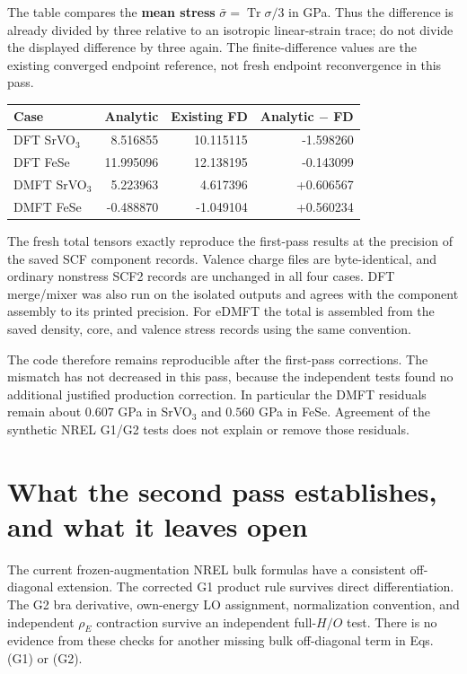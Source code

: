 \documentclass[11pt]{article}
\newcommand{\Tr}{\operatorname{Tr}}
\begin{document}
The table compares the \textbf{mean stress} $\bar\sigma=\Tr\sigma/3$ in GPa. Thus the difference is already divided by three relative to an isotropic linear-strain trace; do not divide the displayed difference by three again. The finite-difference values are the existing converged endpoint reference, not fresh endpoint reconvergence in this pass.
\begin{center}\begin{tabular}{lrrr}\toprule
Case & Analytic & Existing FD & Analytic $-$ FD\\\midrule
DFT SrVO$_3$ & 8.516855 & 10.115115 & -1.598260\\
DFT FeSe & 11.995096 & 12.138195 & -0.143099\\
DMFT SrVO$_3$ & 5.223963 & 4.617396 & +0.606567\\
DMFT FeSe & -0.488870 & -1.049104 & +0.560234\\
\bottomrule\end{tabular}\end{center}
The fresh total tensors exactly reproduce the first-pass results at the precision of the saved SCF component records. Valence charge files are byte-identical, and ordinary nonstress SCF2 records are unchanged in all four cases. DFT merge/mixer was also run on the isolated outputs and agrees with the component assembly to its printed precision. For eDMFT the total is assembled from the saved density, core, and valence stress records using the same convention.

The code therefore remains reproducible after the first-pass corrections. The mismatch has not decreased in this pass, because the independent tests found no additional justified production correction. In particular the DMFT residuals remain about $0.607$ GPa in SrVO$_3$ and $0.560$ GPa in FeSe. Agreement of the synthetic NREL G1/G2 tests does not explain or remove those residuals.


\section{What the second pass establishes, and what it leaves open}
The current frozen-augmentation NREL bulk formulas have a consistent off-diagonal extension. The corrected G1 product rule survives direct differentiation. The G2 bra derivative, own-energy LO assignment, normalization convention, and independent $\rho_E$ contraction survive an independent full-$H/O$ test. There is no evidence from these checks for another missing bulk off-diagonal term in Eqs. (G1) or (G2).
\end{document}
